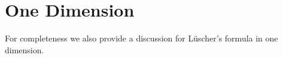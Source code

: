 \section{One Dimension}\label{sec:1D}
For completeness we also provide a discussion for L\"uscher's formula in one dimension.  